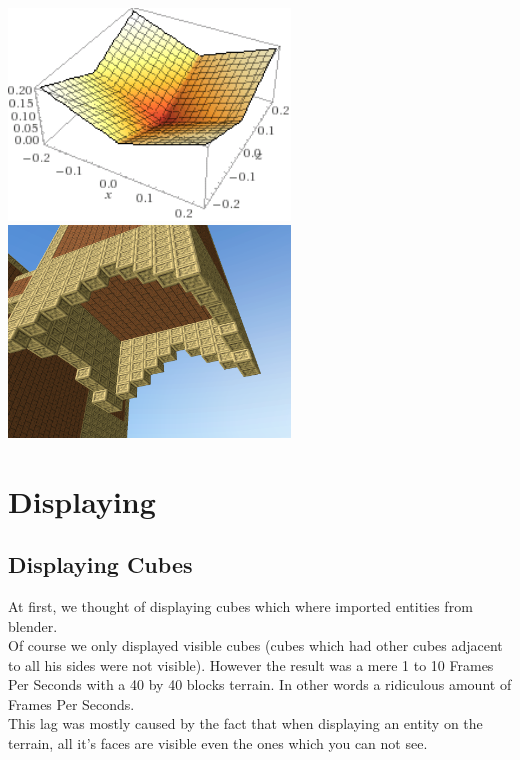 \documentclass[article]{report}         %
\begin{document}
          \begin{center}
            \includegraphics[width=7.5cm]{images/Abs.png}
            \includegraphics[width=7.5cm]{images/DT/DarkBeard.png} %
          \end{center}
      \section{Displaying}
        \subsection{Displaying Cubes}
          At first, we thought of displaying cubes which where imported entities from blender. \\
          Of course we only displayed visible cubes (cubes which had other cubes adjacent to all his sides were not visible). However the result was a mere 1 to 10 Frames Per Seconds with a 40 by 40 blocks terrain. In other words a ridiculous amount of Frames Per Seconds.\\

          This lag was mostly caused by the fact that when displaying an entity on the terrain, all it's faces are visible even the ones which you can not see.
\end{document}
